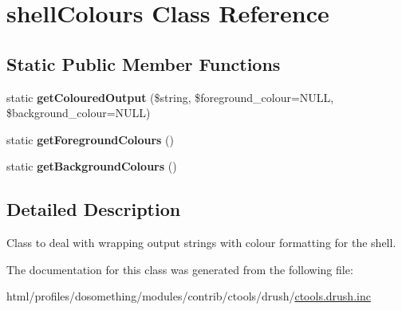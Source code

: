 \hypertarget{classshellColours}{
\section{shellColours Class Reference}
\label{classshellColours}
}
\subsection*{Static Public Member Functions}
\begin{DoxyCompactItemize}
\item 
\hypertarget{classshellColours_a4b6ef736e3e2870e6e0275e60d4fedee}{
static {\bfseries getColouredOutput} (\$string, \$foreground\_\-colour=NULL, \$background\_\-colour=NULL)}
\label{classshellColours_a4b6ef736e3e2870e6e0275e60d4fedee}

\item 
\hypertarget{classshellColours_a1e9fffc82f2a9c5144fd43d46753d3af}{
static {\bfseries getForegroundColours} ()}
\label{classshellColours_a1e9fffc82f2a9c5144fd43d46753d3af}

\item 
\hypertarget{classshellColours_a188b3badcc0ec2abff05f87da2772d70}{
static {\bfseries getBackgroundColours} ()}
\label{classshellColours_a188b3badcc0ec2abff05f87da2772d70}

\end{DoxyCompactItemize}


\subsection{Detailed Description}
Class to deal with wrapping output strings with colour formatting for the shell. 

The documentation for this class was generated from the following file:\begin{DoxyCompactItemize}
\item 
html/profiles/dosomething/modules/contrib/ctools/drush/\hyperlink{ctools_8drush_8inc}{ctools.drush.inc}\end{DoxyCompactItemize}
